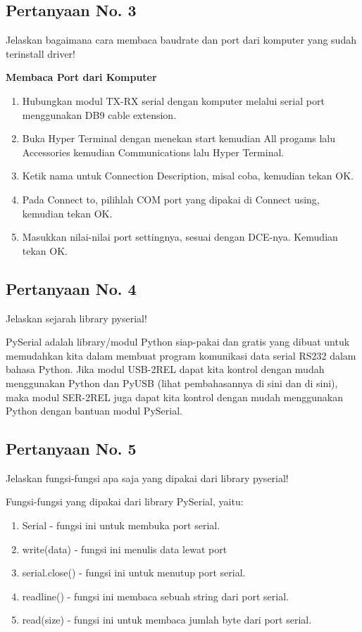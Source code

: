 \subsection{Pertanyaan No. 3}
Jelaskan bagaimana cara membaca baudrate dan port dari komputer yang sudah terinstall driver!

\hfill \break
\textbf{Membaca Port dari Komputer}

\begin{enumerate}
	\item Hubungkan modul TX-RX serial dengan komputer melalui serial port menggunakan DB9 cable extension.
	\item Buka Hyper Terminal dengan menekan start kemudian All progams lalu Accessories kemudian Communications lalu Hyper Terminal.
	\item Ketik nama untuk Connection Description, misal coba, kemudian tekan OK.
	\item Pada Connect to, pilihlah COM port yang dipakai di Connect using, kemudian tekan OK.
	\item Masukkan nilai-nilai port settingnya, sesuai dengan DCE-nya. Kemudian tekan OK.
\end{enumerate}



\subsection{Pertanyaan No. 4}
Jelaskan sejarah library pyserial!

\hfill \break
PySerial adalah library/modul Python siap-pakai dan gratis yang dibuat untuk memudahkan kita dalam membuat program komunikasi data serial RS232 dalam bahasa Python.
Jika modul USB-2REL dapat kita kontrol dengan mudah menggunakan Python dan PyUSB (lihat pembahasannya di sini dan di sini), maka modul SER-2REL juga dapat kita kontrol dengan mudah menggunakan Python dengan bantuan modul PySerial.

\subsection{Pertanyaan No. 5}
Jelaskan fungsi-fungsi apa saja yang dipakai dari library pyserial!

\hfill \break
Fungsi-fungsi yang dipakai dari library PySerial, yaitu:
\begin{enumerate}
	\item Serial - fungsi ini untuk membuka port serial.
	\item write(data) - fungsi ini menulis data lewat port 
	\item serial.close() - fungsi ini untuk menutup port serial.
	\item readline() - fungsi ini membaca sebuah string dari port serial.
	\item read(size) - fungsi ini untuk membaca jumlah byte dari port serial.
\end{enumerate}

